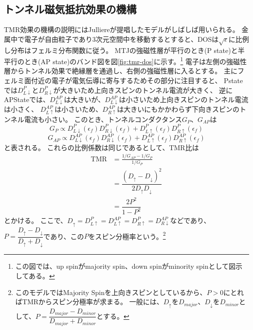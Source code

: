 \documentclass[../../../main]{subfiles}
\begin{document}
\subsection{トンネル磁気抵抗効果の機構}
TMR効果の機構の説明にはJulliereが提唱したモデル\cite{julliere-model}がしばしば用いられる。
金属中で電子が自由粒子であり3次元空間中を移動するとすると、DOSは$\sqrt{\epsilon}$に比例し分布はフェルミ分布関数に従う。
MTJの強磁性層が平行のとき(P state)と半平行のとき(AP state)のバンド図を図\ref{fig:tmr-dos}に示す。\footnote{
    この図では、up spinがmajority spin、down spinがminority spinとして図示してある。
}
電子は左側の強磁性層からトンネル効果で絶縁層を通過し、右側の強磁性層に入るとする。
主にフェルミ面付近の電子が電気伝導に寄与するためその部分に注目すると、
Pstateでは$D^{P}_{L\downarrow}$と$D^{P}_{R\downarrow}$が大きいため上向きスピンのトンネル電流が大きく、
逆にAPStateでは、$D^{AP}_{L\downarrow}$は大きいが、$D^{AP}_{L\downarrow}$は小さいため上向きスピンのトンネル電流は小さく、
$D^{AP}_{L\uparrow}$は小さいため、$D^{AP}_{R\uparrow}$は大きいにもかかわらず下向きスピンのトンネル電流も小さい。
このとき、トンネルコンダクタンス$G_P$、$G_{AP}$は
\begin{equation}\label{eq:tmr-g-p}
    G_P \propto D^{P}_{L\downarrow}(\epsilon_f)D^{P}_{R\downarrow}(\epsilon_f) + D^{P}_{L\uparrow}(\epsilon_f)D^{P}_{R\uparrow}(\epsilon_f)
\end{equation}
\begin{equation}\label{eq:tmr-g-ap}
    G_{AP} \propto D^{AP}_{L\downarrow}(\epsilon_f)D^{AP}_{R\downarrow}(\epsilon_f) + D^{AP}_{L\uparrow}(\epsilon_f)D^{AP}_{R\uparrow}(\epsilon_f)
\end{equation}
と表される。
これらの比例係数は同じであるとして、TMR比は
\begin{align}
    \textrm{TMR} & = \frac{1/G_{AP} - 1/G_P}{1/G_P} \nonumber                                         \\
                 & = \dfrac{(D_{\uparrow} - D_{\downarrow})^2}{2D_{\uparrow}D_{\downarrow}} \nonumber \\
                 & = \dfrac{2P^2}{1 - P^2}
\end{align}
とかける。
ここで、$D_{\uparrow}=D^{P}_{L\uparrow}=D^{AP}_{L\uparrow}=D^{P}_{R\uparrow}=D^{AP}_{R\downarrow}$などであり、
$P=\dfrac{D_{\uparrow}-D_{\downarrow}}{D_{\uparrow}+D_{\downarrow}}$であり、この$P$をスピン分極率という。\footnote{
このモデルではMajority Spinを上向きスピンとしているから、$P>0$にとればTMRからスピン分極率が求まる。
一般には、$D_{\uparrow}$を$D_{major}$、$D_{\downarrow}$を$D_{minor}$として、$P=\dfrac{D_{major}-D_{minor}}{D_{major}+D_{minor}}$とする。
}
\end{document}
